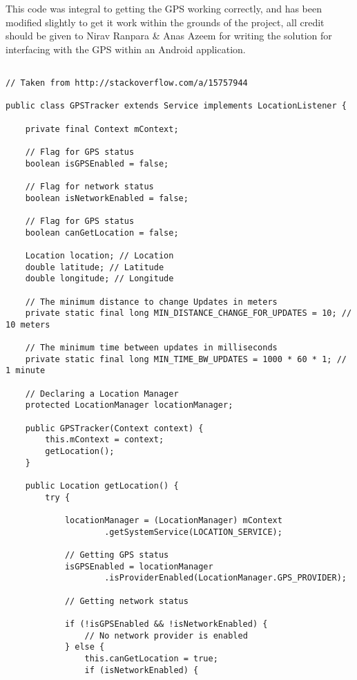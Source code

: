 This code was integral to getting the GPS working correctly, and has been modified slightly to get it work within the grounds of the project, all credit should be given to Nirav Ranpara \& Anas Azeem\cite{mudit:HowdoIgetthecurrentGPSlocationprogrammaticallyinAndroid:2009:online
} for writing the solution for interfacing with the GPS within an Android application.

\begin{lstlisting}

// Taken from http://stackoverflow.com/a/15757944

public class GPSTracker extends Service implements LocationListener {

    private final Context mContext;

    // Flag for GPS status
    boolean isGPSEnabled = false;

    // Flag for network status
    boolean isNetworkEnabled = false;

    // Flag for GPS status
    boolean canGetLocation = false;

    Location location; // Location
    double latitude; // Latitude
    double longitude; // Longitude

    // The minimum distance to change Updates in meters
    private static final long MIN_DISTANCE_CHANGE_FOR_UPDATES = 10; // 10 meters

    // The minimum time between updates in milliseconds
    private static final long MIN_TIME_BW_UPDATES = 1000 * 60 * 1; // 1 minute

    // Declaring a Location Manager
    protected LocationManager locationManager;

    public GPSTracker(Context context) {
        this.mContext = context;
        getLocation();
    }

    public Location getLocation() {
        try {

            locationManager = (LocationManager) mContext
                    .getSystemService(LOCATION_SERVICE);

            // Getting GPS status
            isGPSEnabled = locationManager
                    .isProviderEnabled(LocationManager.GPS_PROVIDER);

            // Getting network status

            if (!isGPSEnabled && !isNetworkEnabled) {
                // No network provider is enabled
            } else {
                this.canGetLocation = true;
                if (isNetworkEnabled) {


\end{lstlisting}

